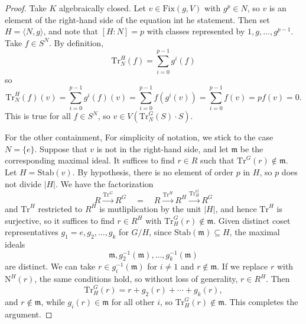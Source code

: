 \documentclass[12pt]{amsart}
\theoremstyle{definition}
\numberwithin{equation}{theorem}
\def\frakm{\mathfrak{m}}
\begin{document}
\begin{proof} Take $K$ algebraically closed.
Let $v\in \mathrm{Fix}(g,V)$ with $g^p\in N$, so $v$ is an element of the right-hand side of the equation int he statement. Then set $H=\langle N, g\rangle$, and note that $[H:N] =p$ with classes represented by $1,g,\dots,g^{p-1}$. Take $f\in S^N$. By definition,
\[ \mathrm{Tr}^H_N(f) = \sum_{i=0}^{p-1} g^i(f)\]
so
\[ \mathrm{Tr}^H_N(f)(v) = \sum_{i=0}^{p-1} g^i(f)(v) = \sum_{i=0}^{p-1} f(g^i(v)) = \sum_{i=0}^{p-1} f(v) = p f(v) = 0. \]
This is true for all $f\in S^N$, so $v\in V( \mathrm{Tr}^G_N(S) \cdot S)$.


For the other containment, For simplicity of notation, we stick to the case $N=\{e\}$.
Suppose that $v$ is not in the right-hand side, and let $\frakm$ be the corresponding maximal ideal. It suffices to find $r\in R$ such that $\mathrm{Tr}^G(r)\notin \frakm$. Let $H=\mathrm{Stab}(v)$. By hypothesis, there is no element of order $p$ in $H$, so $p$ does not divide $|H|$. We have the factorization
\[ R \xrightarrow{ \mathrm{Tr}^G} R^G  \quad  = \quad  R \xrightarrow{ \mathrm{Tr}^H} R^H \xrightarrow{ \mathrm{Tr}^G_H} R^G\]
and  $\mathrm{Tr}^H$ restricted to $R^H$ is mutliplication by the unit $|H|$, and hence $\mathrm{Tr}^H$ is surjective, so it suffices to find $r\in R^H$ with $\mathrm{Tr}^G_H(r)\notin \frakm$. Given distinct coset representatives $g_1=e, g_2,\dots,g_k$ for $G/H$, since $\mathrm{Stab}(\frakm)\subseteq H$, the maximal ideals
\[ \frakm, g^{-1}_2(\frakm),\dots, g^{-1}_k(\frakm)\] are distinct. We can take $r\in g_i^{-1}(\frakm)$ for $i\neq 1$ and $r\notin \frakm$. If we replace $r$ with $\mathrm{N}^H(r)$, the same conditions hold, so without loss of generality, $r\in R^H$. Then
\[ \mathrm{Tr}^G_H(r) = r + g_2(r) + \cdots + g_k(r),\]
and $r\notin \frakm$, while $g_i(r)\in \frakm$ for all other $i$, so $\mathrm{Tr}^G_H(r) \notin \frakm$. This completes the argument.
\end{proof}
\end{document}
